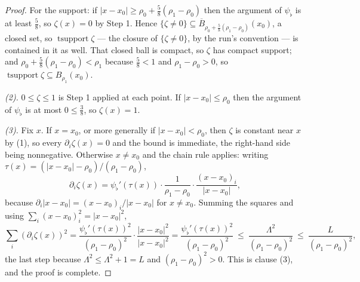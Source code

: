 \begin{proof}
For the support: if $|x-x_0|\ge\rho_0+\tfrac58(\rho_1-\rho_0)$ then the argument
of $\psi_\flat$ is at least $\tfrac58$, so $\zeta(x)=0$ by Step 1.  Hence
$\{\zeta\ne0\}\subseteq\overline B_{\rho_0+\frac58(\rho_1-\rho_0)}(x_0)$, a
closed set, so $\operatorname{tsupport}\zeta$ --- the closure of
$\{\zeta\ne0\}$, by the run's convention --- is contained in it as well.  That
closed ball is compact, so $\zeta$ has compact support; and
$\rho_0+\tfrac58(\rho_1-\rho_0)<\rho_1$ because $\tfrac58<1$ and
$\rho_1-\rho_0>0$, so $\operatorname{tsupport}\zeta\subseteq B_{\rho_1}(x_0)$.

\emph{(2).}  $0\le\zeta\le1$ is Step 1 applied at each point.  If
$|x-x_0|\le\rho_0$ then the argument of $\psi_\flat$ is at most $0\le\tfrac38$,
so $\zeta(x)=1$.

\emph{(3).}  Fix $x$.  If $x=x_0$, or more generally if
$|x-x_0|<\rho_0$, then $\zeta$ is constant near $x$ by (1), so every
$\partial_i\zeta(x)=0$ and the bound is immediate, the right-hand side being
nonnegative.  Otherwise $x\ne x_0$ and the chain rule applies: writing
$\tau(x)=(|x-x_0|-\rho_0)/(\rho_1-\rho_0)$,
\[
\partial_i\zeta(x)=\psi_\flat'(\tau(x))\cdot
\frac1{\rho_1-\rho_0}\cdot\frac{(x-x_0)_i}{|x-x_0|} ,
\]
because $\partial_i|x-x_0|=(x-x_0)_i/|x-x_0|$ for $x\ne x_0$.  Summing the
squares and using $\sum_i(x-x_0)_i^2=|x-x_0|^2$,
\[
\sum_i(\partial_i\zeta(x))^2
=\frac{\psi_\flat'(\tau(x))^2}{(\rho_1-\rho_0)^2}\cdot
\frac{|x-x_0|^2}{|x-x_0|^2}
=\frac{\psi_\flat'(\tau(x))^2}{(\rho_1-\rho_0)^2}
\ \le\ \frac{\Lambda^2}{(\rho_1-\rho_0)^2}
\ \le\ \frac L{(\rho_1-\rho_0)^2} ,
\]
the last step because $\Lambda^2\le\Lambda^2+1=L$ and $(\rho_1-\rho_0)^2>0$.
This is clause (3), and the proof is complete.
\end{proof}
